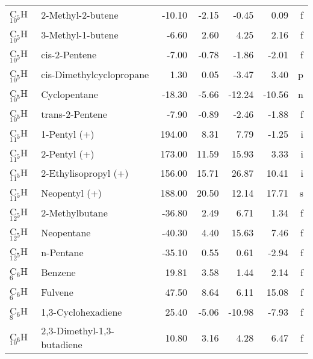 \begin{table}
\begin{center}
\begin{tabular}{llrrrrr}
 C$_5$H$_1$$_0$       & 2-Methyl-2-butene               &   -10.10    &    -2.15  &    -0.45  &     0.09  &      f\\
 C$_5$H$_1$$_0$       & 3-Methyl-1-butene               &    -6.60    &     2.60  &     4.25  &     2.16  &      f\\
 C$_5$H$_1$$_0$       & cis-2-Pentene                   &    -7.00    &    -0.78  &    -1.86  &    -2.01  &      f\\
 C$_5$H$_1$$_0$       & cis-Dimethylcyclopropane        &     1.30    &     0.05  &    -3.47  &     3.40  &      p\\
 C$_5$H$_1$$_0$       & Cyclopentane                    &   -18.30    &    -5.66  &   -12.24  &   -10.56  &      n\\
 C$_5$H$_1$$_0$       & trans-2-Pentene                 &    -7.90    &    -0.89  &    -2.46  &    -1.88  &      f\\
 C$_5$H$_1$$_1$       & 1-Pentyl (+)                    &   194.00    &     8.31  &     7.79  &    -1.25  &      i\\
 C$_5$H$_1$$_1$       & 2-Pentyl (+)                    &   173.00    &    11.59  &    15.93  &     3.33  &      i\\
 C$_5$H$_1$$_1$       & 2-Ethylisopropyl (+)            &   156.00    &    15.71  &    26.87  &    10.41  &      i\\
 C$_5$H$_1$$_1$       & Neopentyl (+)                   &   188.00    &    20.50  &    12.14  &    17.71  &      s\\
 C$_5$H$_1$$_2$       & 2-Methylbutane                  &   -36.80    &     2.49  &     6.71  &     1.34  &      f\\
 C$_5$H$_1$$_2$       & Neopentane                      &   -40.30    &     4.40  &    15.63  &     7.46  &      f\\
 C$_5$H$_1$$_2$       & n-Pentane                       &   -35.10    &     0.55  &     0.61  &    -2.94  &      f\\
 C$_6$H$_6$        & Benzene                         &    19.81    &     3.58  &     1.44  &     2.14  &      f\\
 C$_6$H$_6$        & Fulvene                         &    47.50    &     8.64  &     6.11  &    15.08  &      f\\
 C$_6$H$_8$        & 1,3-Cyclohexadiene              &    25.40    &    -5.06  &   -10.98  &    -7.93  &      f\\
 C$_6$H$_1$$_0$       & 2,3-Dimethyl-1,3-butadiene      &    10.80    &     3.16  &     4.28  &     6.47  &      f\\
\hline
\end{tabular}
\end{center}
\end{table}
\clearpage


